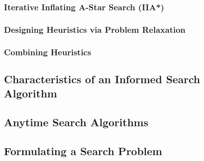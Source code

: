 \subsubsection{Iterative Inflating A-Star Search (IIA*)}

\subsubsection{Designing Heuristics via Problem Relaxation}

\subsubsection{Combining Heuristics}



\subsection{Characteristics of an Informed Search Algorithm}

\subsection{Anytime Search Algorithms}

\subsection{Formulating a Search Problem}






